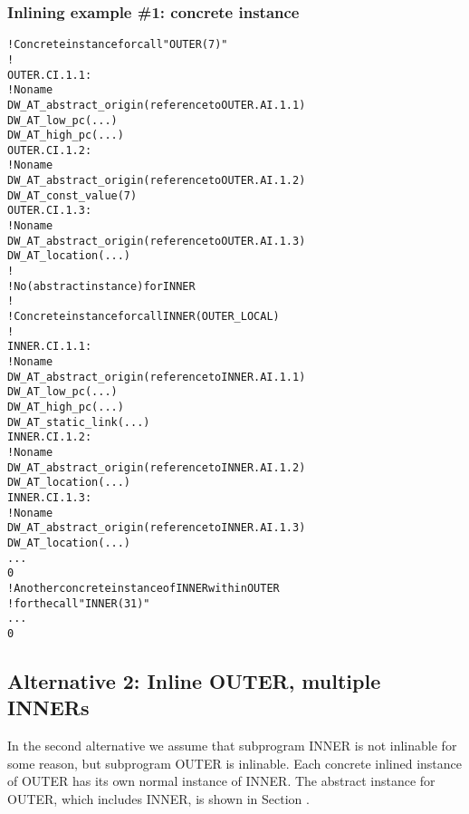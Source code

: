 \subsubsection{Inlining example \#1: concrete instance}
\label{app:inliningexample1concreteinstance}
\begin{alltt}
! Concrete instance for call "OUTER(7)"
!
OUTER.CI.1.1:
        ! No name
        DW\-\_AT\-\_abstract\-\_origin(reference to OUTER.AI.1.1)
        DW\-\_AT\-\_low\-\_pc(...)
        DW\-\_AT\-\_high\-\_pc(...)
OUTER.CI.1.2:
            ! No name
            DW\-\_AT\-\_abstract\-\_origin(reference to OUTER.AI.1.2)
            DW\-\_AT\-\_const\-\_value(7)
OUTER.CI.1.3:
            ! No name
            DW\-\_AT\-\_abstract\-\_origin(reference to OUTER.AI.1.3)
            DW\-\_AT\-\_location(...)
        !
        ! No  (abstract instance) for INNER
        !
        ! Concrete instance for call INNER(OUTER\_LOCAL)
        !
INNER.CI.1.1:
            ! No name
            DW\-\_AT\-\_abstract\-\_origin(reference to INNER.AI.1.1)
            DW\-\_AT\-\_low\-\_pc(...)
            DW\-\_AT\-\_high\-\_pc(...)
            DW\-\_AT\-\_static\-\_link(...)
INNER.CI.1.2:
                ! No name
                DW\-\_AT\-\_abstract\-\_origin(reference to INNER.AI.1.2)
                DW\-\_AT\-\_location(...)
INNER.CI.1.3:
                ! No name
                DW\-\_AT\-\_abstract\-\_origin(reference to INNER.AI.1.3)
                DW\-\_AT\-\_location(...)
            ...
            0
        ! Another concrete instance of INNER within OUTER
        ! for the call "INNER(31)"
        ...
        0
\end{alltt}

\subsection{Alternative 2: Inline OUTER, multiple INNERs}
\label{app:inlineoutermultiipleinners}


In the second alternative we assume that subprogram INNER
is not inlinable for some reason, but subprogram OUTER is
inlinable. Each concrete inlined instance of OUTER has its
own normal instance of INNER. The abstract instance for OUTER,
which includes INNER, is shown in 
Section .

